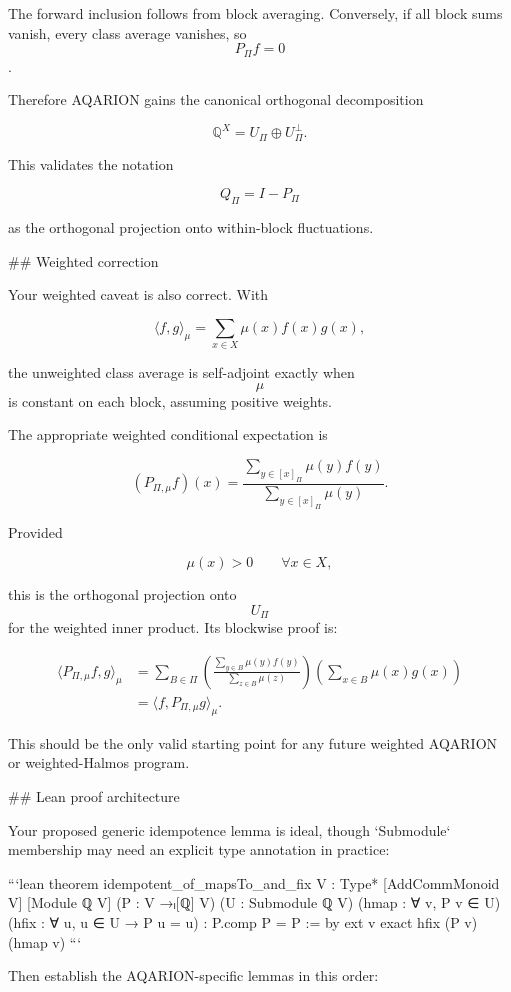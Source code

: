 The forward inclusion follows from block averaging. Conversely, if all block sums vanish, every class average vanishes, so $$P_\Pi f=0$$.

Therefore AQARION gains the canonical orthogonal decomposition

$$
\boxed{
\mathbb Q^X
=
U_\Pi\oplus U_\Pi^\perp.
}
$$

This validates the notation

$$
Q_\Pi=I-P_\Pi
$$

as the orthogonal projection onto within-block fluctuations.

## Weighted correction

Your weighted caveat is also correct. With

$$
\langle f,g\rangle_\mu
=
\sum_{x\in X}\mu(x)f(x)g(x),
$$

the unweighted class average is self-adjoint exactly when $$\mu$$ is constant on each block, assuming positive weights.

The appropriate weighted conditional expectation is

$$
(P_{\Pi,\mu}f)(x)
=
\frac{\sum_{y\in [x]_\Pi}\mu(y)f(y)}
{\sum_{y\in [x]_\Pi}\mu(y)}.
$$

Provided

$$
\mu(x)>0
\qquad
\forall x\in X,
$$

this is the orthogonal projection onto $$U_\Pi$$ for the weighted inner product. Its blockwise proof is:

$$
\begin{aligned}
\langle P_{\Pi,\mu}f,g\rangle_\mu
&=
\sum_{B\in\Pi}
\left(
\frac{\sum_{y\in B}\mu(y)f(y)}
{\sum_{z\in B}\mu(z)}
\right)
\left(\sum_{x\in B}\mu(x)g(x)\right)\\
&=
\langle f,P_{\Pi,\mu}g\rangle_\mu.
\end{aligned}
$$

This should be the only valid starting point for any future weighted AQARION or weighted-Halmos program.

## Lean proof architecture

Your proposed generic idempotence lemma is ideal, though `Submodule` membership may need an explicit type annotation in practice:

```lean
theorem idempotent_of_mapsTo_and_fix
    {V : Type*} [AddCommMonoid V] [Module ℚ V]
    (P : V →ₗ[ℚ] V) (U : Submodule ℚ V)
    (hmap : ∀ v, P v ∈ U)
    (hfix : ∀ u, u ∈ U → P u = u) :
    P.comp P = P := by
  ext v
  exact hfix (P v) (hmap v)
```

Then establish the AQARION-specific lemmas in this order:

